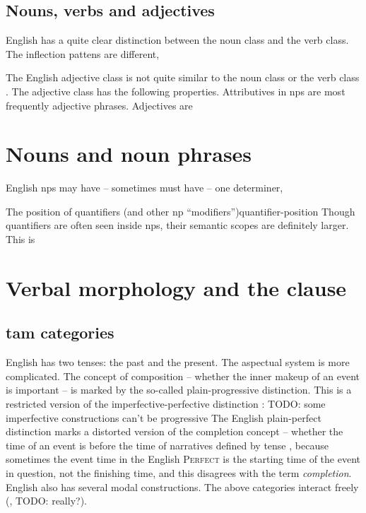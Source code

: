\documentclass[UTF8, a4paper, oneside, scheme=plain]{ctexrep}
\newcommand*{\citesec}[1]{\S~{#1}}
\newcommand*{\citepage}[1]{pp.~{#1}}
\newcommand*{\term}[1]{\emph{#1}}
\newcommand{\category}[1]{\textsc{#1}}
\begin{document}
\subsection{Nouns, verbs and adjectives}

English has a quite clear distinction between the noun class and the verb class.
The inflection pattens are different, 

The English adjective class is not quite similar to the noun class or the verb class 
\citep[\citepage{73}]{dixon2010basic2}.
The adjective class has the following properties.
Attributives in \acs{np}s are most frequently adjective phrases.
Adjectives are 

\section{Nouns and noun phrases}

English \acs{np}s may have -- sometimes must have -- 
one determiner, 

\begin{theorybox}{The position of quantifiers (and other \acs{np} ``modifiers'')}{quantifier-position}
    Though quantifiers are often seen inside \acs{np}s,
    their semantic scopes are definitely larger.
    This is 
\end{theorybox}

\section{Verbal morphology and the clause}

\subsection{\acs{tam} categories}

English has two tenses: the past and the present.
The aspectual system is more complicated. 
The concept of composition 
-- whether the inner makeup of an event is important \citep[\citesec{19.10}]{dixon2012basic3} -- 
is marked by the so-called plain-progressive distinction.
This is a restricted version of the imperfective-perfective distinction \citep{dixon2012basic3}:
TODO: some imperfective constructions can't be progressive
The English plain-perfect distinction marks 
a distorted version of the completion concept 
-- whether the time of an event is before the time of narratives defined by tense 
\citep[\citesec{19.7}]{dixon2012basic3},
because sometimes the event time in the English \category{Perfect} 
is the starting time of the event in question,
not the finishing time,
and this disagrees with the term \term{completion}.
English also has several modal constructions.
The above categories interact freely (, TODO: really?).
\end{document}
